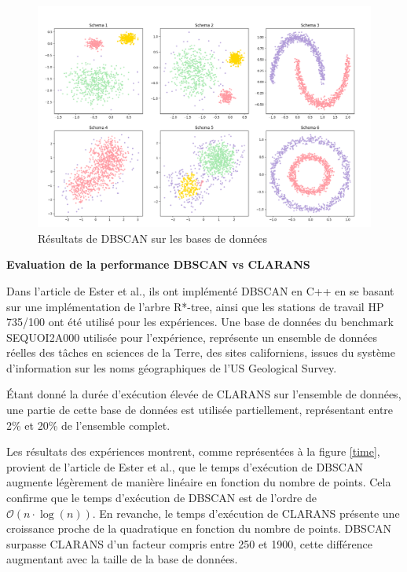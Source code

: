 \documentclass[
  oneside]{memoire-umons}
\begin{document}
\begin{figure}
\centering
\includegraphics{src/memoire-umons/images/new_versions/dbscan_all.png}
\caption{Résultats de DBSCAN sur les bases de données
\label{dbscan_all}}
\end{figure}

\textbf{Evaluation de la performance DBSCAN vs CLARANS}

Dans l'article de Ester et al., ils ont implémenté
DBSCAN en C++ en se basant sur une implémentation de l'arbre R*-tree,
ainsi que les stations de travail HP 735/100 ont été utilisé pour les
expériences. Une base de données du benchmark SEQUOI2A000 utilisée pour
l'expérience, représente un ensemble de données réelles des tâches en
sciences de la Terre, des sites californiens, issues du système
d'information sur les noms géographiques de l'US Geological Survey.

Étant donné la durée d'exécution élevée de CLARANS sur l'ensemble de
données, une partie de cette base de données est utilisée partiellement,
représentant entre 2\% et 20\% de l'ensemble complet.

Les résultats des expériences montrent, comme représentées à la figure
\ref{time}, provient de l'article de Ester et al.,
que le temps d'exécution de DBSCAN augmente légèrement de manière
linéaire en fonction du nombre de points. Cela confirme que le temps
d'exécution de DBSCAN est de l'ordre de \(\mathcal{O}(n\cdot \log(n))\).
En revanche, le temps d'exécution de CLARANS présente une croissance
proche de la quadratique en fonction du nombre de points. DBSCAN
surpasse CLARANS d'un facteur compris entre 250 et 1900, cette
différence augmentant avec la taille de la base de données.
\end{document}

